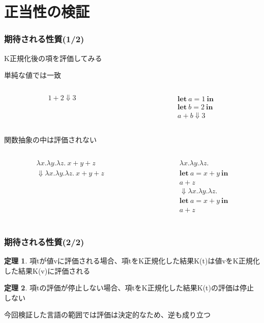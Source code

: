 \documentclass[dvipdfmx,cjk,xcolor=dvipsnames,envcountsect,notheorems,12pt]{beamer}
\theoremstyle{definition}
\newtheorem{theorem}{定理}
\newcommand{\keyword}[1]{\mathbf{#1}}
\newcommand{\LET}{\keyword{let}}
\newcommand{\IN}{\keyword{in}}
\begin{document}
\section{正当性の検証}

\begin{frame}
	\frametitle{期待される性質(1/2)}
	{\LARGE K正規化後の項を評価してみる}

	\vfill

	\Large 単純な値では一致
	{\normalsize \begin{columns}
		\begin{column}{0.4\textwidth}
			\[ 1+2\Downarrow 3 \]
		\end{column}
		\begin{column}{0.4\textwidth}
			\[ 
				\begin{array}{l}
					\LET~a = 1~\IN \\
					\LET~b = 2~\IN \\
					a + b\Downarrow 3
				\end{array}
			\]
		\end{column}
	\end{columns}}

	\vfill

	関数抽象の中は評価されない
	{\normalsize \begin{columns}
		\begin{column}{0.4\textwidth}
			\[
				\begin{array}{l}
					\lambda x.\lambda y.\lambda z.~x+y+z\\
					\Downarrow \lambda x.\lambda y.\lambda z.~x+y+z
				\end{array}
			\]
		\end{column}
		\begin{column}{0.4\textwidth}
			\[ 
				\begin{array}{l}
					\lambda x.\lambda y.\lambda z.\\
					\LET~a = x+y~\IN \\
					a + z \\
					\Downarrow \lambda x.\lambda y.\lambda z.\\
					\LET~a = x+y~\IN \\
					a + z \\
				\end{array}
			\]
		\end{column}
	\end{columns}}
\end{frame}

\begin{frame}
	\frametitle{期待される性質(2/2)}
	{\Large
	\begin{theorem}
		項tが値vに評価される場合、項tをK正規化した結果K(t)は値vをK正規化した結果K(v)に評価される
	\end{theorem}
	\begin{theorem}
		項tの評価が停止しない場合、項tをK正規化した結果K(t)の評価は停止しない
	\end{theorem}}
	\Large 今回検証した言語の範囲では評価は決定的なため、逆も成り立つ

\end{frame}
\end{document}
